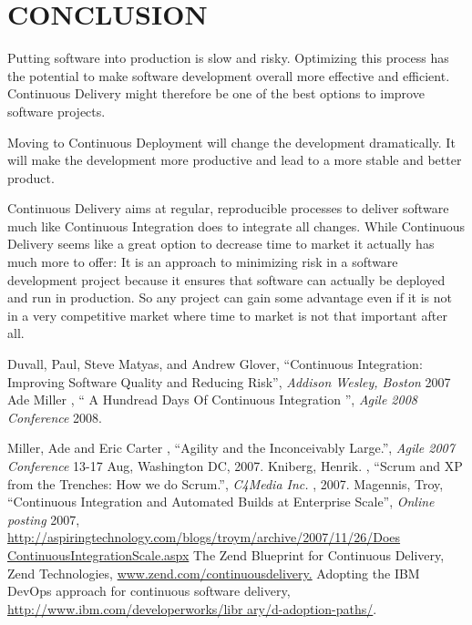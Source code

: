 \documentclass[12pt,a4paper,oneside]{report}
\newcommand{\quotes}[1]{``#1''}
\begin{document}
{\chapter{CONCLUSION}
\par 
Putting software into production is slow and risky. Optimizing this process has the potential to make software development overall more effective and efficient. Continuous Delivery might therefore be one of the best options to improve software projects.
\par
Moving to Continuous Deployment will change the development dramatically. It will make the development more productive and lead to a more stable and better product.
\par
Continuous Delivery aims at regular, reproducible processes to deliver software much like Continuous Integration does to integrate all changes. While Continuous Delivery seems like a great option to decrease time to market it actually has much more to offer: It is an approach to minimizing risk in a software development project because it ensures that software can actually be deployed and run in production. So any project can gain some advantage even if it is not in a very competitive market where time to market is not that important after all.
\renewcommand{\bibname}{\uppercase{REFERENCES}}
\begin{thebibliography}{999}
\raggedright
{} Duvall, Paul, Steve Matyas, and Andrew
Glover, \quotes{Continuous Integration: Improving Software Quality and Reducing Risk}, \textit{ Addison Wesley, Boston} 2007
Ade Miller , \quotes{ A Hundread Days Of Continuous Integration }, \textit{ Agile 2008 Conference} 2008.

Miller, Ade and Eric Carter , \quotes{Agility and the
Inconceivably Large.}, \textit{ Agile 2007 Conference} 
13-17 Aug,
Washington DC, 2007. 
Kniberg, Henrik. , \quotes{Scrum and XP from the
Trenches: How we do Scrum.}, \textit{  C4Media Inc.} 
, 2007. 
 Magennis, Troy, \quotes{Continuous Integration and Automated Builds at Enterprise Scale}, \textit{ Online posting} 2007, \hspace{2pt}  \url{ http://aspiringtechnology.com/blogs/troym/archive/2007/11/26/Does ContinuousIntegrationScale.aspx}
The Zend Blueprint for Continuous Delivery, Zend Technologies, \url{www.zend.com/continuousdelivery.}
 Adopting the IBM DevOps approach for
continuous software delivery, \hspace{2pt}
 \url{http://www.ibm.com/developerworks/libr
ary/d-adoption-paths/}.


\end{thebibliography}}
\end{document}
